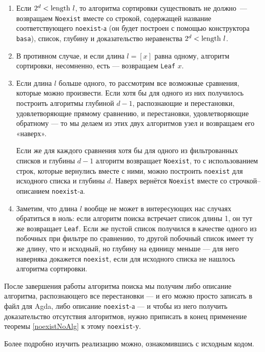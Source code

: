 \begin{enumerate}
\item Если $2^d < \mathrm{length}\  l$, то алгоритма сортировки существовать не должно~— возвращаем {\tt Noexist} вместе со строкой, содержащей название соответствующего {\tt noexist}-а (он будет построен с помощью конструктора {\tt basa}), список, глубину и доказательство неравенства $2^d < \mathrm{length}\  l$.

\item В противном случае, и если длина $l = [x]$ равна одному, алгоритм сортировки, несомненно, есть — возвращаем {\tt Leaf} $x$.

\item Если длина $l$ больше одного, то рассмотрим все возможные сравнения, которые можно произвести. Если хотя бы для одного из них получилось построить алгоритмы глубиной $d-1$, распознающие и перестановки, удовлетворяющие прямому сравнению, и перестановки, удовлетворяющие обратному — то мы делаем из этих двух алгоритмов узел и возвращаем его «наверх».

\smallskip\noindent Если же для каждого сравнения хотя бы для одного из фильтрованных списков и глубины $d-1$ алгоритм возвращает {\tt Noexist}, то с использованием строк, которые вернулись вместе с ними, можно построить {\tt noexist} для исходного списка и глубины $d$. Наверх вернётся {\tt Noexist} вместе со строчкой–описанием {\tt noexist}-а.

\item Заметим, что длина $l$ вообще не может в интересующих нас случаях обратиться в ноль: если алгоритм поиска встречает список длины 1, он тут же возвращает {\tt Leaf}. Если же пустой список получился в качестве одного из побочных при фильтре по сравнению, то другой побочный список имеет ту же длину, что и исходный, но глубину на единицу меньше — для него наверняка докажется {\tt noexist}, если для исходного списка не нашлось алгоритма сортировки.
\end{enumerate}

После завершения работы алгоритма поиска мы получим либо описание алгоритма, распознающего все перестановки — и его можно просто записать в файл для Agda, либо описание {\tt noexist}-а — и чтобы из него получить доказательство отсутствия алгоритмов, нужно приписать в конец применение теоремы \ref{noexistNoAlg} к этому {\tt noexist}-у.

\abz Более подробно изучить реализацию можно, ознакомившись с исходным кодом.